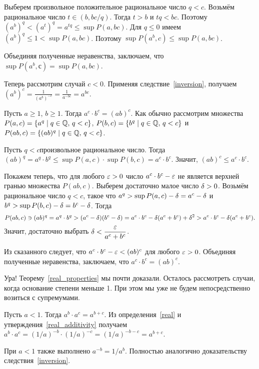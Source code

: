 \documentclass[a4paper,12pt,fleqn]{article}
\begin{document}
Выберем произвольное положительное рациональное число $q < c$. Возьмём рациональное число $t \in (b, bc/q)$. Тогда $t > b$ и $tq < bc$. Поэтому $(a^b)^q < (a^t)^q = a^{tq} \le \sup P(a,bc)$. Для $q \le 0$ имеем $(a^b)^q \le 1 < \sup P(a,bc)$. Поэтому $\sup P(a^b,c) \le \sup P(a,bc)$.

Объединяя полученные неравенства, заключаем, что $\sup P(a^b,с) = \sup P(a,bc)$.

Теперь рассмотрим случай $c < 0$. Применяя следствие~\ref{inversion}, получаем $(a^b)^c = \frac{1}{(a^b)^{-c}} = \frac{1}{a^{-bc}} = a^{bc}$.


\label{real_multiplicativity}
Пусть $a \ge 1$, $b \ge 1$. Тогда $a^c \cdot b^c = (ab)^c$.
Как обычно рассмотрим множества $P(a,c) = \{a^q \mid q\in\mathbb{Q},\, q < c\}$, $P(b,c) = \{b^q \mid q\in\mathbb{Q},\, q < c\}$ и $P(ab,c) = \{(ab)^q \mid q\in\mathbb{Q},\, q < c\}$.

Пусть $q < c$\т произвольное рациональное число. Тогда $(ab)^q = a^q \cdot b^q \le \sup P(a,c) \cdot \sup P(b,c) = a^c \cdot b^c$. Значит, $(ab)^c \le a^c \cdot b^c$. 

Покажем теперь, что для любого $\varepsilon > 0$ число $a^c \cdot b^c - \varepsilon$ не является верхней гранью множества $P(ab,c)$. Выберем достаточно малое число $\delta > 0$. Возьмём рациональное число $q < c$, такое что $a^{q} > \sup P(a,c) - \delta = a^c - \delta$ и $b^{q} > \sup P(b,c) - \delta = b^c - \delta$. Тогда
\[
P(ab,c) \ni (ab)^q = a^q \cdot b^q > (a^c - \delta)(b^c - \delta) = a^c \cdot b^c - \delta(a^c + b^c) + \delta^2 > a^c \cdot b^c - \delta (a^c + b^c).
\]
Значит, достаточно выбрать $\delta < \dfrac{\varepsilon}{a^c + b^c}$.

Из сказанного следует, что $a^c \cdot b^c - \varepsilon < (ab)^c$ для любого $\varepsilon > 0$. Объединяя полученные неравенства, заключаем, что $a^c \cdot b^c = (ab)^c$.

\medskip

Ура! Теорему~\ref{real_properties} мы почти доказали. Осталось рассмотреть случаи, когда основание степени меньше 1. При этом мы уже не будем непосредственно возиться с супремумами.

Пусть $a < 1$. Тогда $a^b \cdot a^c = a^{b+c}$.
Из определения~\ref{real} и утверждения~\ref{real_additivity} получаем $a^b \cdot a^c = (1/a)^{-b} \cdot (1/a)^{-c} = (1/a)^{-b-c} = a^{b+c}$.

\label{inversion_2}
При $a < 1$ также выполнено $a^{-b} = 1/a^b$.
Полностью аналогично доказательству следствия~\ref{inversion}.
\end{document}
